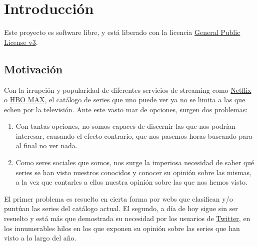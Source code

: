 \chapter{Introducción}
Este proyecto es software libre, y está liberado con la licencia
\href{http://www.gnu.org/licenses/gpl.html}{General Public License v3}\cite{gplv3}.

\section{Motivación}
Con la irrupción y popularidad de diferentes servicios de streaming como \href{https://netflix.com}{Netflix} o
\href{https://hbomax.com}{HBO MAX}, el catálogo de series que uno puede ver ya no se limita a las que echen por la
televisión. Ante este vasto mar de opciones, surgen dos problemas:

\begin{enumerate}
    \item Con tantas opciones, no somos capaces de discernir las que nos podrían interesar, causando el efecto
    contrario, que nos pasemos horas buscando para al final no ver nada.
    \item Como seres sociales que somos, nos surge la imperiosa necesidad de saber qué series se han visto nuestros
    conocidos y conocer su opinión sobre las mismas, a la vez que contarles a ellos nuestra opinión sobre las que nos
    hemos visto.
\end{enumerate}

El primer problema es resuelto en cierta forma por webs que clasifican y/o puntúan las series del catálogo actual. El
segundo, a día de hoy sigue sin ser resuelto y está más que demostrada su necesidad por los usuarios de
\href{https://twitter.com}{Twitter}, en los innumerables hilos en los que exponen su opinión sobre las series que han
visto a lo largo del año.

